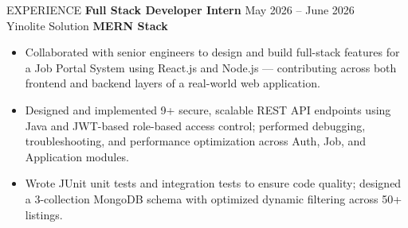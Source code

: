 \documentclass{resume}
\begin{document}
\begin{rSection}{EXPERIENCE}
\vspace{-2pt}
\textbf{Full Stack Developer Intern} \hfill {May 2026 -- June 2026}\\
Yinolite Solution \hfill {\small \textbf{MERN Stack}}
\begin{itemize}[leftmargin=*, itemsep=-3pt, topsep=0pt]
\item Collaborated with senior engineers to design and build full-stack features for a Job
Portal System using React.js and Node.js — contributing across both frontend and backend
layers of a real-world web application.
\item Designed and implemented 9+ secure, scalable REST API endpoints using Java and JWT-based
role-based access control; performed debugging, troubleshooting, and performance optimization
across Auth, Job, and Application modules.
\item Wrote JUnit unit tests and integration tests to ensure code quality; designed a
3-collection MongoDB schema with optimized dynamic filtering across 50+ listings.
\end{itemize}
\vspace{-4pt}
\end{rSection}
\end{document}
